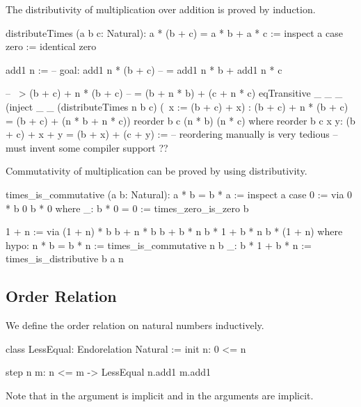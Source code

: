The distributivity of multiplication over addition is proved by induction.
%
\begin{alba}
    distributeTimes (a b c: Natural): a * (b + c) = a * b + a * c :=
        inspect a case
            zero :=
                identical zero

            add1 n :=
                -- goal:  add1 n * (b + c)
                --        = add1 n * b + add1 n * c

                -- ~>     (b + c) + n * (b + c)
                --        = (b + n * b) + (c + n * c)
                eqTransitive _ _ _
                    (inject _ _
                        (distributeTimes n b c)
                        (\ x := (b + c) + x)
                        : (b + c) + n * (b + c) = (b + c) + (n * b + n * c))
                    reorder b c (n * b) (n * c)
                where
                    reorder b c x y: (b + c) + x + y = (b + x) + (c + y)
                    :=
                        -- reordering manually is very tedious
                        -- must invent some compiler support
                        ??
\end{alba}

Commutativity of multiplication can be proved by using distributivity.

\begin{alba}
  times_is_commutative (a b: Natural): a * b = b * a :=
    inspect a case
      0 :=
       via 0 * b
           0
           b * 0
       where
         _: b * 0 = 0 := times_zero_is_zero b

      1 + n :=
        via
          (1 + n) * b
          b + n * b
          b + b * n
          b * 1 + b * n
          b * (1 + n)
        where
          hypo: n * b = b * n := times_is_commutative n b
          _: b * 1 + b * n := times_is_distributive b a n
\end{alba}









\subsection{Order Relation}

We define the order relation on natural numbers inductively.

\begin{alba}
    class
        LessEqual: Endorelation Natural
    :=
        init {n}:
            0 <= n

        step {n m}:
            n <= m
            -> LessEqual n.add1 m.add1
\end{alba}
%
Note that in  the argument  is implicit and in  the arguments  are implicit.

